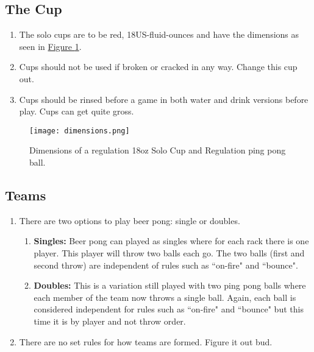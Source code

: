 	\subsection{The Cup}\label{ssec:Cup}
        \begin{enumerate}[label=(\roman*)]
            \item \label{sssec:Cup,dim} The solo cups are to be red, 18US-fluid-ounces and have the dimensions as seen in \hyperref[fig:solocup]{Figure \ref{fig:solocup}}. 
            \item \label{sssec:Cup,broken} Cups should not be used if broken or cracked in any way. Change this cup out. 
            \item \label{ssec:Cup,rinsing} Cups should be rinsed before a game in both water and drink versions before play. Cups can get quite gross. 
        \end{enumerate}
        \begin{figure}[H]
            \centering
            \texttt{[image: dimensions.png]}
            \caption{Dimensions of a regulation 18oz Solo Cup and Regulation ping pong ball.}
            \label{fig:solocup}
        \end{figure}
	\subsection{Teams}\label{ssec:Teams}
		\begin{enumerate}[label=(\roman*)]
            \item \label{sssec:teams,options} There are two options to play beer pong: single or doubles. 
                \begin{enumerate}[label=(\alph*), leftmargin=2cm]%
                    \item \textbf{Singles:} Beer pong can played as singles where for each rack there is one player.
                        This player will throw two balls each go. 
                        The two balls (first and second throw) are independent of rules such as ``on-fire" and ``bounce".
                    \item \textbf{Doubles:}	This is a variation still played with two ping pong balls where each member of the team now throws a single ball.
                        Again, each ball is considered independent for rules such as ``on-fire" and ``bounce" but this time it is by player and not throw order.
                \end{enumerate} 
            \item \label{sssec:teams,choosing} There are no set rules for how teams are formed. Figure it out bud. 
        \end{enumerate}

